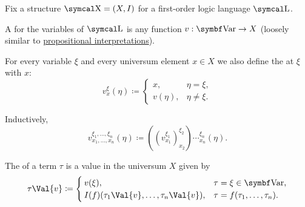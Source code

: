 \begin{definition}\label{def:first_order_valuation}
  Fix a structure \( \CX = (X, I) \) for a first-order logic language \( \CL \).

  \begin{DefEnum}
     A  for the variables of \( \CL \) is any function \( v: \Bold{Var} \to X \) (loosely similar to \hyperref[def:propositional_valuation/interpretation]{propositional interpretations}).

     For every variable \( \xi \) and every universum element \( x \in X \) we also define the  at \( \xi \) with \( x \):
    \begin{equation*}
      v_x^\xi(\eta) \coloneqq \begin{cases}
        x,    &\eta = \xi, \\
        v(\eta), &\eta \neq \xi.
      \end{cases}
    \end{equation*}

    Inductively\IND,
    \begin{equation*}
      v_{x_1, \ldots, x_n}^{\xi_1, \ldots, \xi_n}(\eta) \coloneqq ((v_{x_1}^{\xi_1})_{x_2}^{\xi_2})\cdots_{x_n}^{\xi_n}(\eta).
    \end{equation*}

     The  of a term \( \tau \) is a value in the universum \( X \) given by
    \begin{equation}\label{eq:def:first_order_valuation/term_valuation}
      \tau\Val{v} \coloneqq \begin{cases}
        v(\xi),                                     &\tau = \xi \in \Bold{Var}, \\
        I(f)(\tau_1\Val{v}, \ldots, \tau_n\Val{v}), &\tau = f(\tau_1, \ldots, \tau_n).
      \end{cases}
    \end{equation}


\end{DefEnum}
\end{definition}
